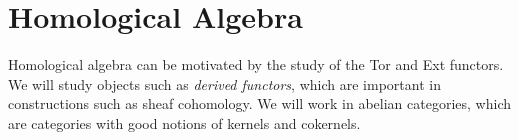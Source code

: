 \chapter{Homological Algebra}
Homological algebra can be motivated by the study of the Tor and Ext functors. We will study objects such as \emph{derived functors}, which are important in constructions such as sheaf cohomology. We will work in abelian categories, which are categories with good notions of kernels and cokernels.









